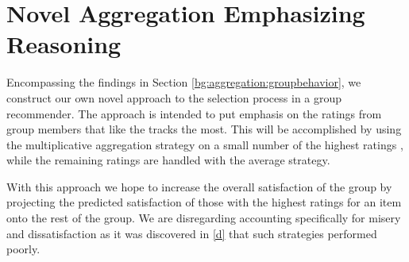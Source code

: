 \section{Novel Aggregation Emphasizing Reasoning}
Encompassing the findings in Section \ref{bg:aggregation:groupbehavior}, we construct our own novel approach to the selection process in a group recommender. The approach is intended to put emphasis on the ratings from group members that like the tracks the most. This will be accomplished by using the multiplicative aggregation strategy on a small number of the highest ratings , while the remaining ratings are handled with the average strategy.

With this approach we hope to increase the overall satisfaction of the group by projecting the predicted satisfaction of those with the highest ratings for an item onto the rest of the group. We are disregarding accounting specifically for misery and dissatisfaction as it was discovered in \ref{d}  that such strategies performed poorly.

